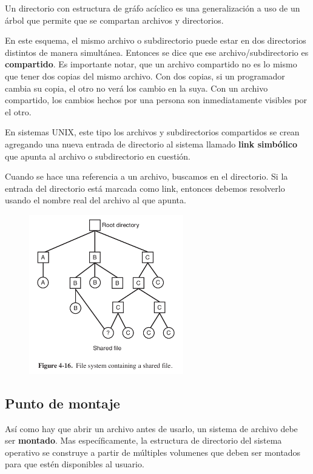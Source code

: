 Un directorio con estructura de gráfo acíclico es una generalización a uso de un árbol que permite que se compartan archivos y directorios.

En este esquema, el mismo archivo o subdirectorio puede estar en dos directorios distintos de manera simultánea. Entonces se dice que ese archivo/subdirectorio es \textbf{compartido}. Es importante notar, que un archivo compartido no es lo mismo que tener dos copias del mismo archivo. Con dos copias, si un programador cambia su copia, el otro no verá los cambio en la suya. Con un archivo compartido, los cambios hechos por una persona son inmediatamente visibles por el otro.

En sistemas UNIX, este tipo los archivos y subdirectorios compartidos se crean agregando una nueva entrada de directorio al sistema llamado \textbf{link simbólico} que apunta al archivo o subdirectorio en cuestión.

Cuando se hace una referencia a un archivo, buscamos en el directorio. Si la entrada del directorio está marcada como link, entonces debemos resolverlo usando el nombre real del archivo al que apunta.

\begin{figure}[h]
	\centering
	\includegraphics[width=0.6\textwidth]{imagenes/directorio-dag}
	\label{fig:directorio-dag}
\end{figure}

\subsection{Punto de montaje}
Así como hay que abrir un archivo antes de usarlo, un sistema de archivo debe ser \textbf{montado}. Mas específicamente, la estructura de directorio del sistema operativo se construye a partir de múltiples volumenes que deben ser montados para que estén disponibles al usuario.

